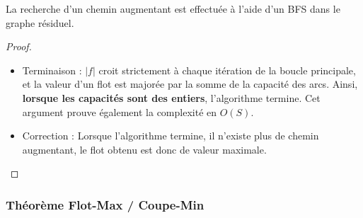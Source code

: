 \documentclass[11pt,a4paper]{article}
\begin{document}
La recherche d'un chemin augmentant est effectuée à l'aide d'un BFS dans le graphe résiduel.

\begin{proof} \leavevmode
  \begin{itemize}
    \item Terminaison : \(|f|\) croit strictement à chaque itération de la boucle principale, et la valeur d'un flot est majorée par la somme de la capacité des arcs. Ainsi, \textbf{lorsque les capacités sont des entiers}, l'algorithme termine. Cet argument prouve également la complexité en \(O(S)\).
    \item Correction : Lorsque l'algorithme termine, il n'existe plus de chemin augmentant, le flot obtenu est donc de valeur maximale.
  \end{itemize}
\end{proof}


    \subsubsection{Théorème Flot-Max / Coupe-Min}
\end{document}
